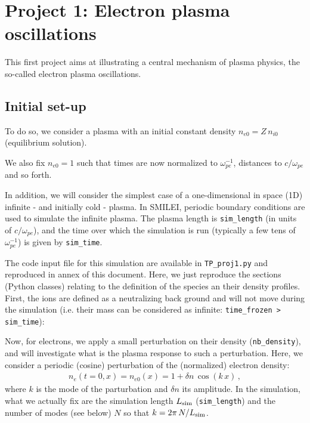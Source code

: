 \documentclass[11pt,a4paper]{article}
\begin{document}
\newpage
\section*{Project 1: Electron plasma oscillations}\label{proj1}

This first project aims at illustrating a central mechanism of plasma physics, the so-called electron plasma oscillations.

\subsection*{Initial set-up}
To do so, we consider a plasma with an initial  constant density $n_{e0} = Z\,n_{i0}$ (equilibrium solution).

We also fix $n_{e0}=1$ such that times are now normalized to $\omega_{pe}^{-1}$, distances to $c/\omega_{pe}$ and so forth.

In addition, we will consider the simplest case of a one-dimensional in space (1D) infinite - and initially cold - plasma.
In SMILEI, periodic boundary conditions are used to simulate the infinite plasma.
The plasma length is \texttt{sim\_length}  (in units of $c/\omega_{pe}$), and the time over which the simulation is run (typically a few tens of $\omega_{pe}^{-1}$) is given by \texttt{sim\_time}. 

The code input file for this simulation are available in \texttt{TP\_proj1.py} and reproduced in annex of this document.
Here, we just reproduce the sections (Python classes) relating to the definition of the species an their density profiles. 
First, the ions are defined as a neutralizing back ground and will not move during the simulation (i.e. their mass can be considered as infinite: \texttt{time\_frozen > sim\_time}):


Now, for electrons, we apply a small perturbation on their density (\texttt{nb\_density}), and will investigate what is the plasma response to such a perturbation.
Here, we consider a periodic (cosine) perturbation of the (normalized) electron density:
\begin{eqnarray}\label{eq_pert}
n_e(t=0,x) = n_{e0}(x) = 1 + \delta n\,\cos(k\,x)\,,
\end{eqnarray}
where $k$ is the mode of the parturbation and $\delta n$ its amplitude. 
In the simulation, what we actually fix are the simulation length $L_{\rm sim}$ (\texttt{sim\_length}) and the number of modes (see below) $N$ so that $k=2\pi\,N/L_{\rm sim}$.
\end{document}
